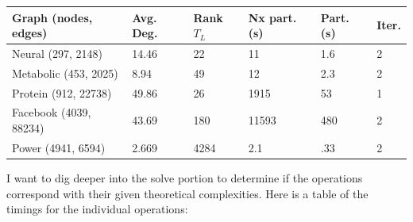 \documentclass{article}
\begin{document}
\begin{center}
\renewcommand{\arraystretch}{1.5}
    \begin{tabular}{| l | l | l | l | l | l |}
    \hline
    Graph (nodes, edges) & Avg. Deg. & Rank $T_L$ & Nx part. (s) & Part. (s) & Iter. \\ \hline
    Neural (297, 2148) & 14.46 & 22 & 11 & 1.6 & 2 \\ \hline
    Metabolic (453, 2025) & 8.94 & 49 & 12 & 2.3 & 2 \\  \hline
    Protein (912, 22738) & 49.86 & 26 & 1915 & 53 & 1 \\ \hline
    Facebook (4039, 88234) & 43.69 &  180 & 11593 & 480 & 2 \\ \hline
    Power (4941, 6594) & 2.669 & 4284 & 2.1 & .33 & 2 \\ 
    \hline
    \end{tabular}
\end{center}
I want to dig deeper into the solve portion to determine if the operations correspond with their given theoretical complexities. Here is a table of the timings for the individual operations:\\
\end{document}
